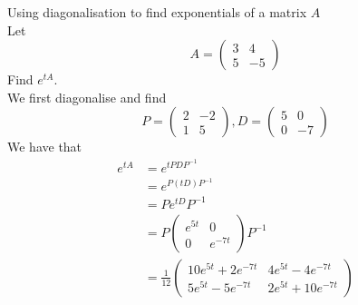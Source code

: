 \documentclass[journal, letterpaper]{IEEEtran}
\begin{document}
    \begin{myboxg}{Using diagonalisation to find exponentials of a matrix $A$} \\ 
        Let 
        $$ A = \begin{pmatrix}
            3 & 4 \\ 5 & -5
        \end{pmatrix}$$
        Find $e^{tA}$.
        \newline \\ 
        We first diagonalise and find
        $$ P = \begin{pmatrix}
            2 & -2 \\ 1 & 5
        \end{pmatrix}, D = \begin{pmatrix}
            5 & 0 \\ 0 & -7
        \end{pmatrix}$$
        We have that
        \begin{align*}
            e^{tA} &= e^{tPDP^{-1}} \\
            &= e^{P(tD)P^{-1}} \\
            &= P e^{tD}P^{-1} \\
            &= P \begin{pmatrix}
                e^{5t} & 0 \\ 0 & e^{-7t}
            \end{pmatrix} P^{-1} \\
            &= \frac{1}{12}\begin{pmatrix}
                10e^{5t} + 2e^{-7t} & 4e^{5t} - 4e^{-7t} \\ 
                5e^{5t} - 5e^{-7t} & 2e^{5t} + 10e^{-7t}
            \end{pmatrix}
        \end{align*}
    \end{myboxg}
\end{document}

